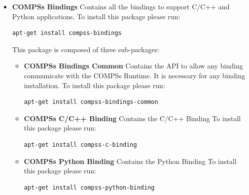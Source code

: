 \begin{itemize}
 \item \textbf{COMPSs Bindings} \newline
       Contains all the bindings to support C/C++ and Python applications. 
       \newline
       To install this package please run:
       \begin{lstlisting}[language=bash]
	  apt-get install compss-bindings
       \end{lstlisting}
       This package is composed of three sub-packages:
       \begin{itemize}
        \item \textbf{COMPSs Bindings Common} \newline
	      Contains the API to allow any binding communicate with the COMPSs Runtime. It is necessary for any binding installation.
	      \newline
	      To install this package please run:
	      \begin{lstlisting}[language=bash]
		  apt-get install compss-bindings-common
	      \end{lstlisting}
        \item \textbf{COMPSs C/C++ Binding} \newline
	      Contains the C/C++ Binding
	      \newline
	      To install this package please run:
	      \begin{lstlisting}[language=bash]
		  apt-get install compss-c-binding
	      \end{lstlisting}
        \item \textbf{COMPSs Python Binding} \newline
	      Contains the Python Binding
	      \newline
	      To install this package please run:
	      \begin{lstlisting}[language=bash]
		  apt-get install compss-python-binding
	      \end{lstlisting}
       \end{itemize}


\end{itemize}
